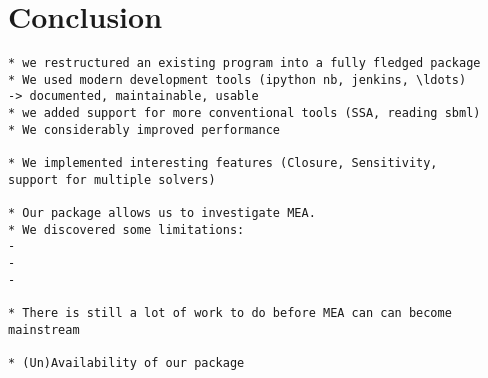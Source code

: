 \section{Conclusion} \label{sec:conclus}
\begin{verbatim}
* we restructured an existing program into a fully fledged package
* We used modern development tools (ipython nb, jenkins, \ldots)
-> documented, maintainable, usable
* we added support for more conventional tools (SSA, reading sbml)
* We considerably improved performance

* We implemented interesting features (Closure, Sensitivity,
support for multiple solvers)

* Our package allows us to investigate MEA.
* We discovered some limitations:
-
-
-

* There is still a lot of work to do before MEA can can become mainstream

* (Un)Availability of our package

\end{verbatim}

